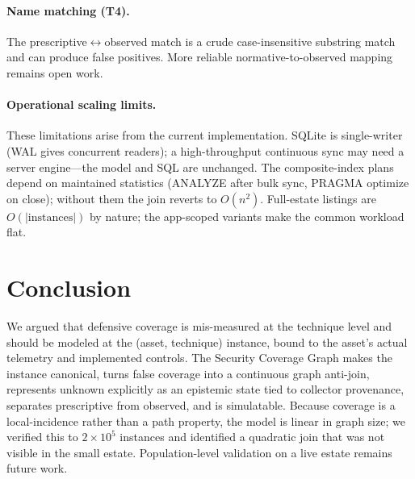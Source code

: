 \documentclass[10pt]{article}
\begin{document}
\paragraph{Name matching (T4).} The prescriptive$\leftrightarrow$observed match is a crude case-insensitive substring match and can produce false positives. More reliable normative-to-observed mapping remains open work.

\paragraph{Operational scaling limits.} These limitations arise from the current implementation. SQLite is single-writer (WAL gives concurrent readers); a high-throughput continuous sync may need a server engine---the model and SQL are unchanged. The composite-index plans depend on maintained statistics (ANALYZE after bulk sync, PRAGMA optimize on close); without them the join reverts to $O(n^2)$. Full-estate listings are $O(|\text{instances}|)$ by nature; the app-scoped variants make the common workload flat.

\section{Conclusion}
We argued that defensive coverage is mis-measured at the technique level and should be modeled at the (asset, technique) instance, bound to the asset's actual telemetry and implemented controls. The Security Coverage Graph makes the instance canonical, turns false coverage into a continuous graph anti-join, represents unknown explicitly as an epistemic state tied to collector provenance, separates prescriptive from observed, and is simulatable. Because coverage is a local-incidence rather than a path property, the model is linear in graph size; we verified this to $2\times10^5$ instances and identified a quadratic join that was not visible in the small estate. Population-level validation on a live estate remains future work.
\end{document}
